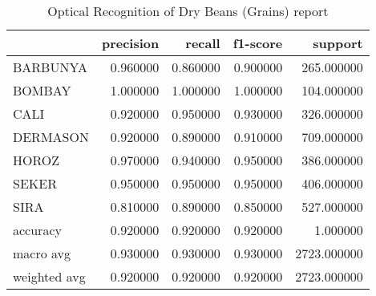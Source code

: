 \begin{table}
\caption{Optical Recognition of Dry Beans (Grains) report}
\begin{tabular}{lrrrr}
\toprule
 & precision & recall & f1-score & support \\
\midrule
BARBUNYA & 0.960000 & 0.860000 & 0.900000 & 265.000000 \\
BOMBAY & 1.000000 & 1.000000 & 1.000000 & 104.000000 \\
CALI & 0.920000 & 0.950000 & 0.930000 & 326.000000 \\
DERMASON & 0.920000 & 0.890000 & 0.910000 & 709.000000 \\
HOROZ & 0.970000 & 0.940000 & 0.950000 & 386.000000 \\
SEKER & 0.950000 & 0.950000 & 0.950000 & 406.000000 \\
SIRA & 0.810000 & 0.890000 & 0.850000 & 527.000000 \\
accuracy & 0.920000 & 0.920000 & 0.920000 & 1.000000 \\
macro avg & 0.930000 & 0.930000 & 0.930000 & 2723.000000 \\
weighted avg & 0.920000 & 0.920000 & 0.920000 & 2723.000000 \\
\bottomrule
\end{tabular}
\end{table}
